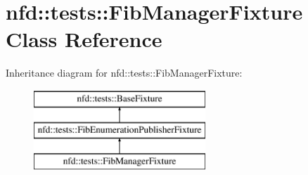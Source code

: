 \hypertarget{classnfd_1_1tests_1_1FibManagerFixture}{}\section{nfd\+:\+:tests\+:\+:Fib\+Manager\+Fixture Class Reference}
\label{classnfd_1_1tests_1_1FibManagerFixture}
Inheritance diagram for nfd\+:\+:tests\+:\+:Fib\+Manager\+Fixture\+:\begin{figure}[H]
\begin{center}
\leavevmode
\includegraphics[height=3.000000cm]{classnfd_1_1tests_1_1FibManagerFixture}
\end{center}
\end{figure}
